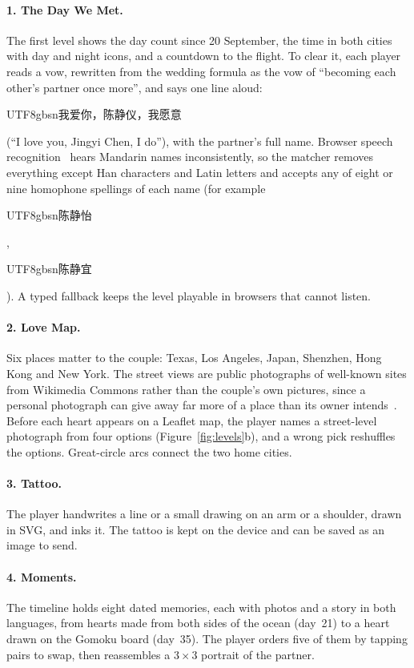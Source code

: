 \documentclass[sigconf,nonacm]{acmart}
\newcommand{\zh}[1]{\begingroup\normalfont\begin{CJK*}{UTF8}{gbsn}#1\end{CJK*}\endgroup}
\begin{document}
\paragraph{1. The Day We Met.} The first level shows the day count since 20 September, the time
in both cities with day and night icons, and a countdown to the flight. To clear it, each player
reads a vow, rewritten from the wedding formula as the vow of ``becoming each other's partner
once more'', and says one line aloud: \zh{我爱你，陈静仪，我愿意} (``I love you, Jingyi Chen, I do''),
with the partner's full name. Browser speech recognition~\cite{w3c2023speech} hears Mandarin
names inconsistently, so the matcher removes everything except Han characters and Latin
letters and accepts any of eight or nine homophone spellings of each name (for example \zh{陈静怡},
\zh{陈静宜}). A typed fallback keeps the level playable in browsers that cannot listen.

\paragraph{2. Love Map.} Six places matter to the couple: Texas, Los Angeles, Japan, Shenzhen,
Hong Kong and New York. The street views are public photographs of well-known sites from
Wikimedia Commons rather than the couple's own pictures, since a personal photograph can give away
far more of a place than its owner intends~\cite{yang2024geolocator}. Before each heart appears on a Leaflet map, the player names a
street-level photograph from four options (Figure~\ref{fig:levels}b), and a wrong pick reshuffles the
options. Great-circle arcs connect the two home cities.

\paragraph{3. Tattoo.} The player handwrites a line or a small drawing on an arm or a shoulder,
drawn in SVG, and inks it. The tattoo is kept on the device and can be saved as an image to send.

\paragraph{4. Moments.} The timeline holds eight dated memories, each with photos and a story in
both languages, from hearts made from both sides of the ocean (day~21) to a heart drawn on the
Gomoku board (day~35). The player orders five of them by tapping pairs to swap, then reassembles a
$3\times3$ portrait of the partner.
\end{document}
